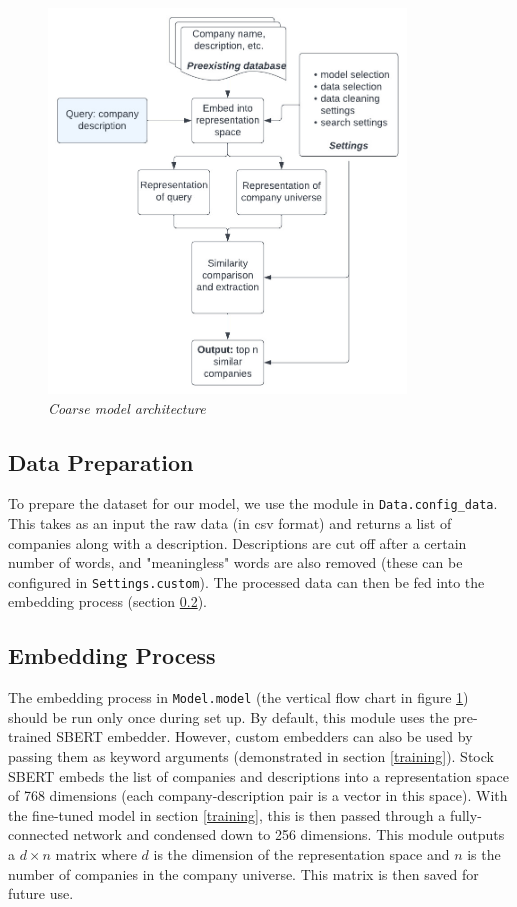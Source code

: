 \documentclass[a4paper]{article}
\begin{document}
\begin{figure}[!h]
    \centerline{\includegraphics[width=95mm]{uml.jpeg}} \caption{{\it Coarse
    model architecture}}
    \label{setup}
\end{figure}

\subsection{Data Preparation}
To prepare the dataset for our model, we use the module in
\lstinline{Data.config_data}. This takes as an input the raw data (in csv
format) and returns a list of companies along with a description. Descriptions
are cut off after a certain number of words, and "meaningless" words are
also removed (these can be configured in \lstinline{Settings.custom}).
The processed data can then be fed into the embedding process (section \ref{embprocess}).

\subsection{Embedding Process} \label{embprocess} The embedding process in
\lstinline{Model.model} (the vertical flow chart in figure \ref{setup}) should
be run only once during set up. By default, this module uses the pre-trained
SBERT embedder. However, custom embedders can also be used by passing them as
keyword arguments (demonstrated in section \ref{training}). Stock SBERT embeds
the list of companies and descriptions into a representation space of 768
dimensions (each company-description pair is a vector in this space). With the
fine-tuned model in section \ref{training}, this is then passed through a
fully-connected network and condensed down to 256 dimensions. This module
outputs a $d\times n$ matrix where $d$ is the dimension of the representation
space and $n$ is the number of companies in the company universe. This matrix
is then saved for future use.
\end{document}
